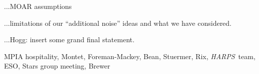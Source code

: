 \documentclass[modern]{aastex61}
\newcommand{\acronym}[1]{{\small{#1}}}
\newcommand{\project}[1]{\textsl{#1}}
\newcommand{\HARPS}{\project{\acronym{HARPS}}}
\begin{document}
...MOAR assumptions

...limitations of our ``additional noise'' ideas and what we have considered.

...Hogg: insert some grand final statement.

\acknowledgements
MPIA hospitality, Montet, Foreman-Mackey, Bean, Stuermer, Rix, \HARPS\ team, ESO, Stars group meeting, Brewer


\end{document}
